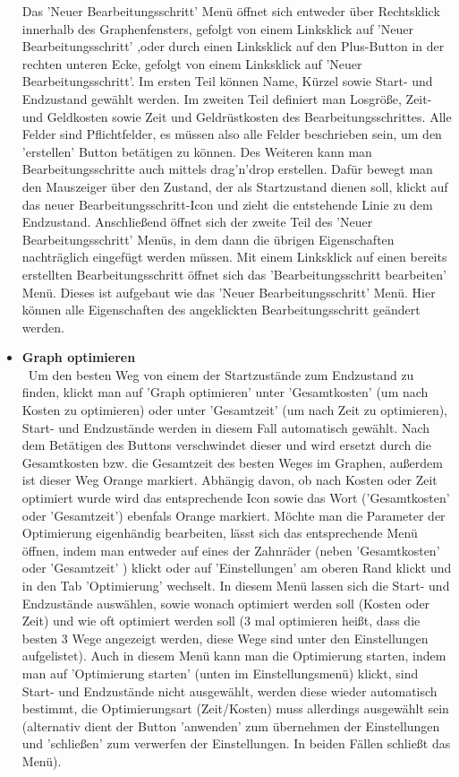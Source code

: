 \documentclass[twoside]{report}
\begin{document}
\begin{itemize}
      Das 'Neuer Bearbeitungsschritt' Menü öffnet sich entweder über Rechtsklick innerhalb des Graphenfensters, gefolgt von einem Linksklick auf 'Neuer Bearbeitungsschritt' ,oder durch einen Linksklick auf den Plus-Button in der rechten unteren Ecke, gefolgt von einem Linksklick auf 'Neuer Bearbeitungsschritt'. Im ersten Teil können Name, Kürzel sowie Start- und Endzustand gewählt werden. Im zweiten Teil definiert man Losgröße, Zeit- und Geldkosten sowie Zeit und Geldrüstkosten des Bearbeitungsschrittes. Alle Felder sind Pflichtfelder, es müssen also alle Felder beschrieben sein, um den 'erstellen' Button betätigen zu können. Des Weiteren kann man Bearbeitungsschritte auch mittels drag'n'drop erstellen. Dafür bewegt man den Mauszeiger über den Zustand, der als Startzustand dienen soll, klickt auf das neuer Bearbeitungsschritt-Icon und zieht die entstehende Linie zu dem Endzustand. Anschließend öffnet sich der zweite Teil des 'Neuer Bearbeitungsschritt' Menüs, in dem dann die übrigen Eigenschaften  nachträglich eingefügt werden müssen.
Mit einem Linksklick auf einen bereits erstellten Bearbeitungsschritt öffnet sich das 'Bearbeitungsschritt bearbeiten' Menü. Dieses ist aufgebaut wie das 'Neuer Bearbeitungsschritt' Menü. Hier können alle Eigenschaften des angeklickten Bearbeitungsschritt geändert werden.
  \item \textbf{ Graph optimieren }
    \\\
      Um den besten Weg von einem der Startzustände zum Endzustand zu finden, klickt man auf 'Graph optimieren' unter 'Gesamtkosten' (um nach Kosten zu optimieren) oder unter 'Gesamtzeit' (um nach Zeit zu optimieren), Start- und Endzustände werden in diesem Fall automatisch gewählt. Nach dem Betätigen des Buttons verschwindet dieser und wird ersetzt durch die Gesamtkosten bzw. die Gesamtzeit des besten Weges im Graphen, außerdem ist dieser Weg Orange markiert. Abhängig davon, ob nach Kosten oder Zeit optimiert wurde wird das entsprechende Icon sowie das Wort ('Gesamtkosten' oder 'Gesamtzeit') ebenfals Orange markiert.
Möchte man die Parameter der Optimierung eigenhändig bearbeiten, lässt sich das entsprechende Menü öffnen, indem man entweder auf eines der Zahnräder (neben 'Gesamtkosten' oder 'Gesamtzeit' ) klickt oder auf 'Einstellungen' am oberen Rand klickt und in den Tab 'Optimierung' wechselt. In diesem Menü lassen sich die Start- und Endzustände auswählen, sowie wonach optimiert werden soll (Kosten oder Zeit) und wie oft optimiert werden soll (3 mal optimieren heißt, dass die besten 3 Wege angezeigt werden, diese Wege sind unter den Einstellungen aufgelistet). Auch in diesem Menü kann man die Optimierung starten, indem man auf 'Optimierung starten' (unten im Einstellungsmenü) klickt, sind Start- und Endzustände nicht ausgewählt, werden diese wieder automatisch bestimmt, die Optimierungsart (Zeit/Kosten) muss allerdings ausgewählt sein (alternativ dient der Button 'anwenden' zum übernehmen der Einstellungen und 'schließen' zum verwerfen der Einstellungen. In beiden Fällen schließt das Menü).

\end{itemize}
\end{document}
